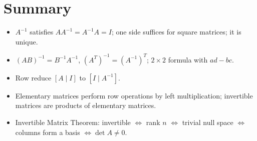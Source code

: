 \section*{Summary}
\begin{itemize}
  \item $A^{-1}$ satisfies $AA^{-1}=A^{-1}A=I$; one side suffices for square matrices; it is unique.
  \item $(AB)^{-1}=B^{-1}A^{-1}$, $(A^T)^{-1}=(A^{-1})^T$; $2\times 2$ formula with $ad-bc$.
  \item Row reduce $[A\mid I]$ to $[I\mid A^{-1}]$.
  \item Elementary matrices perform row operations by left multiplication; invertible matrices are
        products of elementary matrices.
  \item Invertible Matrix Theorem: invertible $\Leftrightarrow$ rank $n$ $\Leftrightarrow$ trivial
        null space $\Leftrightarrow$ columns form a basis $\Leftrightarrow\det A\ne0$.
\end{itemize}
